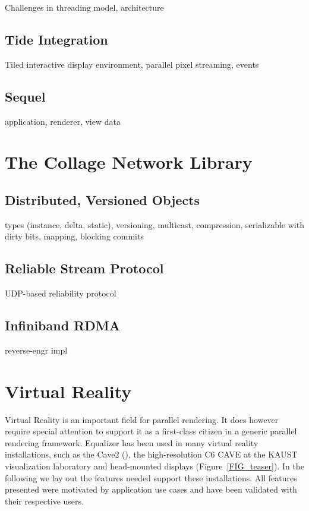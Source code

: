 \documentclass[journal]{vgtc}                %
\newcommand{\fig}[1]{Figure~\ref{#1}}
\begin{document}
Challenges in threading model, architecture

\subsection{Tide Integration}

Tiled interactive display environment, parallel pixel streaming, events

\subsection{Sequel}

application, renderer, view data

\section{The Collage Network Library}

\subsection{Distributed, Versioned Objects}

types (instance, delta, static), versioning, multicast, compression,
serializable with dirty bits, mapping, blocking commits

\subsection{Reliable Stream Protocol}

UDP-based reliability protocol

\subsection{Infiniband RDMA}

reverse-engr impl

\section{Virtual Reality}

Virtual Reality is an important field for parallel rendering. It does however
require special attention to support it as a first-class citizen in a generic
parallel rendering framework. Equalizer has been used in many virtual reality
installations, such as the Cave2 (\cite{FNTTL:13}), the high-resolution C6 CAVE
at the KAUST visualization laboratory and head-mounted displays
(\fig{FIG_teaser}). In the following we lay out the features needed support
these installations. All features presented were motivated by application use
cases and have been validated with their respective users.
\end{document}
